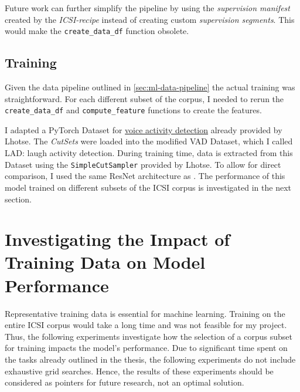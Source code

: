\documentclass[bsc,frontabs,parskip,deptreport]{infthesis}
\begin{document}
Future work can further simplify the pipeline by using the \textit{supervision manifest} created by the \textit{ICSI-recipe} instead of creating custom \textit{supervision segments}. This would make the \verb|create_data_df| function obsolete. 


\section{Training}
Given the data pipeline outlined in \autoref{sec:ml-data-pipeline} the actual training was straightforward. For each different subset of the corpus, I needed to rerun the \verb|create_data_df| and \verb|compute_feature| functions to create the features. 

I adapted a PyTorch Dataset for \href{https://lhotse.readthedocs.io/en/latest/datasets.html#lhotse.dataset.vad.VadDataset}{voice activity detection} already provided by Lhotse.
The \textit{CutSets} were loaded into the modified VAD Dataset, which I called LAD: laugh activity detection.
During training time, data is extracted from this Dataset using the \texttt{SimpleCutSampler} provided by Lhotse. 
To allow for direct comparison, I used the same ResNet architecture as \citet{gillick2021robust}.
The performance of this model trained on different subsets of the ICSI corpus is investigated in the next section.

\chapter{Investigating the Impact of Training Data on Model Performance} \label{cha:experiments}
Representative training data is essential for machine learning. Training on the entire ICSI corpus would take a long time and was not feasible for my project.
Thus, the following experiments investigate how the selection of a corpus subset for training impacts the model's performance. 
Due to significant time spent on the tasks already outlined in the thesis, the following experiments do not include exhaustive grid searches. Hence, the results of these experiments should be considered as pointers for future research, not an optimal solution.
\end{document}
